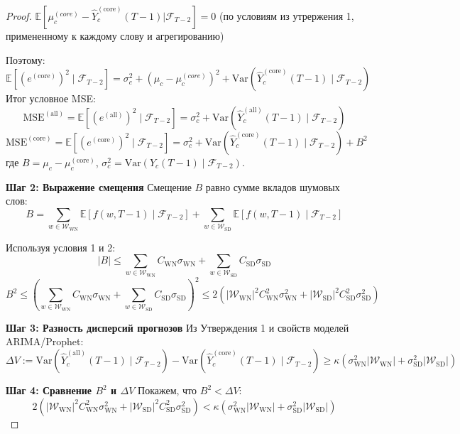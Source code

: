\documentclass[14pt,a4paper]{article}
\begin{document}
\begin{proof}
\(\mathbb{E}[\mu_c^{(core)} - \widehat{Y}_c^{(\mathrm{core})}(T-1) | \mathcal{F}_{T-2}] = 0\)   (по условиям из утрержения 1, примененному к каждому слову и агрегированию)

Поэтому:
\[
\mathbb{E}[(e^{(\mathrm{core})})^2 \mid \mathcal{F}_{T-2}]
= \sigma_c^2 + (\mu_c - \mu_c^{(core)})^2 + \text{Var}(\widehat{Y}_c^{(\mathrm{core})}(T-1) \mid \mathcal{F}_{T-2})
\]
Итог условное MSE:
\[
\mathrm{MSE}^{(\mathrm{all})} = \mathbb{E} \left[ \left( e^{(\mathrm{all})} \right)^2 \mid \mathcal{F}_{T-2} \right] = \sigma_c^2 + \mathrm{Var}\left( \widehat{Y}_c^{(\mathrm{all})}(T-1) \mid \mathcal{F}_{T-2} \right)
\]
\[
\mathrm{MSE}^{(\mathrm{core})} = \mathbb{E} \left[ \left( e^{(\mathrm{core})} \right)^2 \mid \mathcal{F}_{T-2} \right] = \sigma_c^2 + \mathrm{Var}\left( \widehat{Y}_c^{(\mathrm{core})}(T-1) \mid \mathcal{F}_{T-2} \right) + B^2
\]
где $B = \mu_c - \mu_c^{(\mathrm{core})}$, $\sigma_c^2 = \mathrm{Var}(Y_c(T-1) \mid \mathcal{F}_{T-2})$.

\textbf{Шаг 2: Выражение смещения}
Смещение $B$ равно сумме вкладов шумовых слов:
\[
B = \sum_{w \in \mathcal{W}_{\mathrm{WN}}} \mathbb{E}[f(w,T-1) \mid \mathcal{F}_{T-2}] + \sum_{w \in \mathcal{W}_{\mathrm{SD}}} \mathbb{E}[f(w,T-1) \mid \mathcal{F}_{T-2}]
\]

Используя условия 1 и 2:
\[
|B| \leq \sum_{w \in \mathcal{W}_{\mathrm{WN}}} C_{\mathrm{WN}} \sigma_{\mathrm{WN}} + \sum_{w \in \mathcal{W}_{\mathrm{SD}}} C_{\mathrm{SD}} \sigma_{\mathrm{SD}}
\]
\[
B^2 \leq \left( \sum_{w \in \mathcal{W}_{\mathrm{WN}}} C_{\mathrm{WN}} \sigma_{\mathrm{WN}} + \sum_{w \in \mathcal{W}_{\mathrm{SD}}} C_{\mathrm{SD}} \sigma_{\mathrm{SD}} \right)^2 \leq 2 \left( |\mathcal{W}_{\mathrm{WN}}|^2 C_{\mathrm{WN}}^2 \sigma_{\mathrm{WN}}^2 + |\mathcal{W}_{\mathrm{SD}}|^2 C_{\mathrm{SD}}^2 \sigma_{\mathrm{SD}}^2 \right)
\]

\textbf{Шаг 3: Разность дисперсий прогнозов}
Из Утверждения 1 и свойств моделей ARIMA/Prophet:
\[
\Delta V := \mathrm{Var}\left( \widehat{Y}_c^{(\mathrm{all})}(T-1) \mid \mathcal{F}_{T-2} \right) - \mathrm{Var}\left( \widehat{Y}_c^{(\mathrm{core})}(T-1) \mid \mathcal{F}_{T-2} \right) \geq \kappa \left( \sigma_{\mathrm{WN}}^2 |\mathcal{W}_{\mathrm{WN}}| + \sigma_{\mathrm{SD}}^2 |\mathcal{W}_{\mathrm{SD}}| \right)
\]

\textbf{Шаг 4: Сравнение $B^2$ и $\Delta V$}
Покажем, что $B^2 < \Delta V$:
\[
2 \left( |\mathcal{W}_{\mathrm{WN}}|^2 C_{\mathrm{WN}}^2 \sigma_{\mathrm{WN}}^2 + |\mathcal{W}_{\mathrm{SD}}|^2 C_{\mathrm{SD}}^2 \sigma_{\mathrm{SD}}^2 \right) < \kappa \left( \sigma_{\mathrm{WN}}^2 |\mathcal{W}_{\mathrm{WN}}| + \sigma_{\mathrm{SD}}^2 |\mathcal{W}_{\mathrm{SD}}| \right)
\]


\end{proof}
\end{document}
